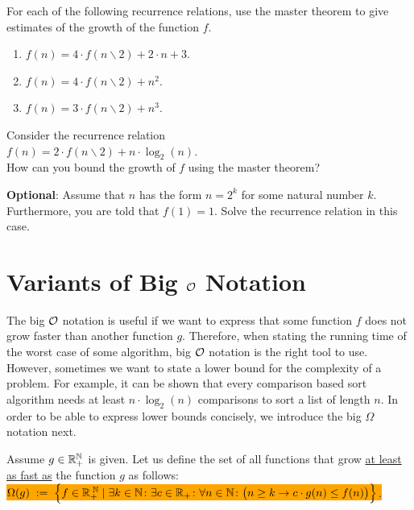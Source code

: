 \exercise
For each of the following recurrence relations, use the master theorem to give estimates of the
growth of the function $f$. 
\begin{enumerate}
\item $f(n) = 4 \cdot f(n \backslash 2) + 2 \cdot n + 3$.
\item $f(n) = 4 \cdot f(n \backslash 2) + n^2$.
\item $f(n) = 3 \cdot f(n \backslash 2) + n^3$.  \eox
\end{enumerate}



\exercise
Consider the recurrence relation
\\[0.2cm]
\hspace*{1.3cm}
$f(n) = 2 \cdot f(n \backslash 2) + n \cdot \log_2(n)$.
\\[0.2cm] 
How can you bound the growth of $f$ using the master theorem? 
\vspace*{0.1cm}

\noindent
\textbf{Optional}: Assume that $n$ has the form $n = 2^k$ for some natural number $k$.
Furthermore, you are told that $f(1) = 1$.  Solve the recurrence relation in this case.
\eox

\section{Variants of Big $\mathcal{O}$ Notation}
The big $\mathcal{O}$ notation is useful if we want to express that some function $f$ does not grow faster
than another function $g$.  Therefore, when stating the running time of the worst case of some algorithm,
big $\mathcal{O}$ notation is the right tool to use.  However, sometimes we want to state a lower bound for
the complexity of a problem.  For example, it can be shown that every comparison based sort algorithm needs at least
$n \cdot \log_2(n)$ comparisons to sort a list of length $n$.  In order to be able to express lower
bounds concisely, we introduce the big $\Omega$ notation next.

\begin{Definition}[$\Omega(g)$] 
  Assume $g \in {\mathbb R}_+^{{\mathbb N}}$ is given.   Let us define the set of all functions that grow 
  \underline{at least as fast as} the function $g$ as follows:
  \\[0.2cm]
  \hspace*{0.5cm} 
  \colorbox{orange}{
  $ \Omega(g) \;:=\; \Bigl\{ f \in {\mathbb R}_+^{\;{\mathbb N}} \mid \exists k \in {\mathbb N} \colon 
    \exists c \in {\mathbb R}_+\colon \forall n \in {\mathbb N} \colon\bigl(n \geq k \rightarrow c \cdot g(n) \leq f(n)\bigr)\Bigr\}$.}
  \eox
\end{Definition}

